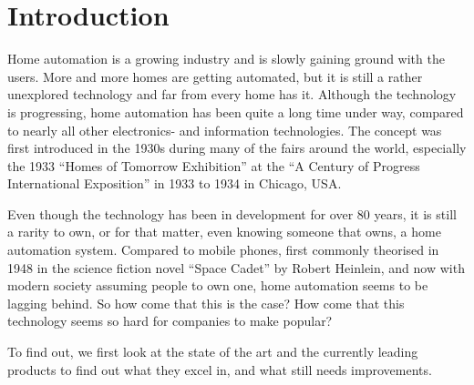 \chapter{Introduction}\label{part:introduction}

Home automation is a growing industry and is slowly gaining ground with the users. More and more homes are getting automated, but it is still a rather unexplored technology and far from every home has it. Although the technology is progressing, home automation has been quite a long time under way, compared to nearly all other electronics- and information technologies. The concept was first introduced in the 1930s during many of the fairs around the world, especially the 1933 \enquote{Homes of Tomorrow Exhibition} at the \enquote{A Century of Progress International Exposition} in 1933 to 1934 in Chicago, USA.

Even though the technology has been in development for over 80 years, it is still a rarity to own, or for that matter, even knowing someone that owns, a home automation system. Compared to mobile phones, first commonly theorised in 1948 in the science fiction novel \enquote{Space Cadet} by Robert Heinlein, and now with modern society assuming people to own one, home automation seems to be lagging behind. So how come that this is the case? How come that this technology seems so hard for companies to make popular?

To find out, we first look at the state of the art and the currently leading products to find out what they excel in, and what still needs improvements.

